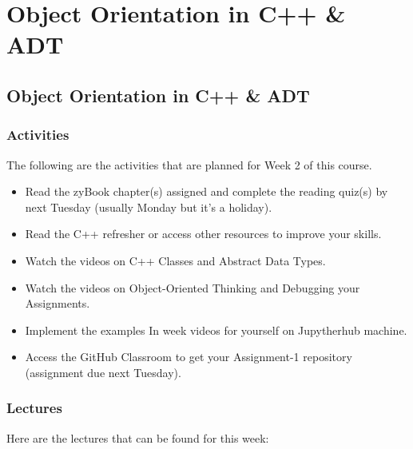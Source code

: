 \clearpage

\renewcommand{\ChapTitle}{Object Orientation in C++ \& ADT}

\chapter{\ChapTitle}
\section{\ChapTitle}

\subsection{Activities}

The following are the activities that are planned for Week 2 of this course.

\begin{itemize}
    \item Read the zyBook chapter(s) assigned and complete the reading quiz(s) by next Tuesday (usually Monday but it's a holiday).
    \item Read the C++ refresher or access other resources to improve your skills.
    \item Watch the videos on C++ Classes and Abstract Data Types.
    \item Watch the videos on Object-Oriented Thinking and Debugging your Assignments.
    \item Implement the examples In week videos for yourself on Jupytherhub machine.
    \item Access the GitHub Classroom to get your Assignment-1 repository  (assignment due next Tuesday).
\end{itemize}

\subsection{Lectures}

Here are the lectures that can be found for this week:

